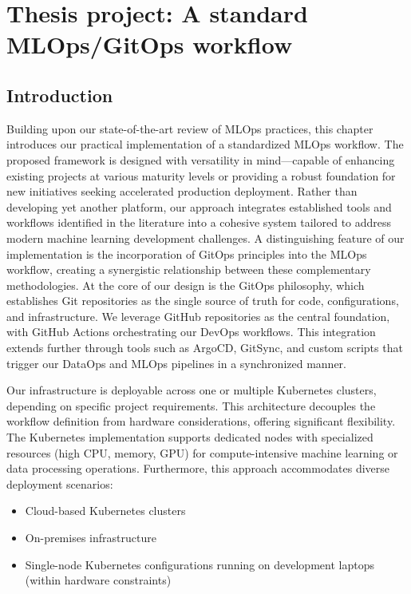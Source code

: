 \chapter{Thesis project: A standard MLOps/GitOps workflow}\label{ch:thesis-project:-a-standard-mlops-ci/cd-workflow}
\section{Introduction}\label{sec:introduction}
Building upon our state-of-the-art review of MLOps practices, this chapter introduces our practical implementation of a standardized MLOps workflow.
The proposed framework is designed with versatility in mind—capable of enhancing existing projects at various maturity levels or providing a robust foundation for new initiatives seeking accelerated production deployment.
Rather than developing yet another platform, our approach integrates established tools and workflows identified in the literature into a cohesive system tailored to address modern machine learning development challenges.
A distinguishing feature of our implementation is the incorporation of GitOps principles into the MLOps workflow, creating a synergistic relationship between these complementary methodologies.
At the core of our design is the GitOps philosophy, which establishes Git repositories as the single source of truth for code, configurations, and infrastructure.
We leverage GitHub repositories as the central foundation, with GitHub Actions orchestrating our DevOps workflows.
This integration extends further through tools such as ArgoCD, GitSync, and custom scripts that trigger our DataOps and MLOps pipelines in a synchronized manner.

Our infrastructure is deployable across one or multiple Kubernetes clusters, depending on specific project requirements.
This architecture decouples the workflow definition from hardware considerations, offering significant flexibility.
The Kubernetes implementation supports dedicated nodes with specialized resources (high CPU, memory, GPU) for compute-intensive machine learning or data processing operations.
Furthermore, this approach accommodates diverse deployment scenarios:


\begin{itemize}

\item Cloud-based Kubernetes clusters

\item On-premises infrastructure

\item Single-node Kubernetes configurations running on development laptops (within hardware constraints)

\end{itemize}

